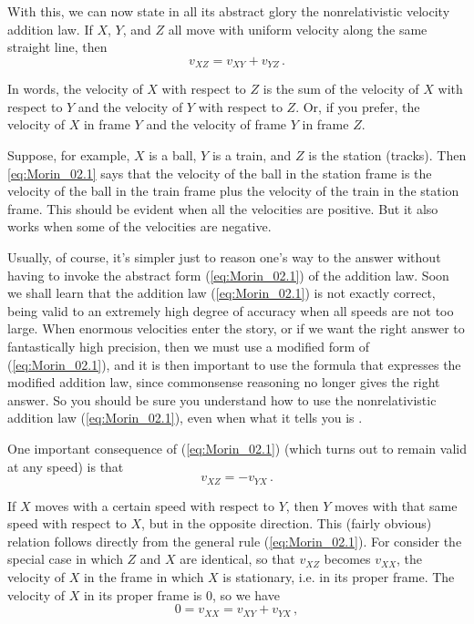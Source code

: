 With this, we can now state in all its abstract glory the nonrelativistic velocity addition law. If $X$, $Y$, and $Z$ all move with uniform velocity along the same straight line, then 
\begin{equation}\label{eq:Morin_02.1}
v_{XZ} = v_{XY} + v_{YZ}\,. 
\end{equation}

In words, the velocity of $X$ with respect to $Z$ is the sum of the velocity of $X$ with respect to $Y$ and the velocity of $Y$ with respect to $Z$. Or, if you prefer, the velocity of $X$ in frame $Y$ and the velocity of frame $Y$ in frame $Z$.

Suppose, for example, $X$ is a ball, $Y$ is a train, and $Z$ is the station (tracks). Then \ref{eq:Morin_02.1} says that the velocity of the ball in the station frame is the velocity of the ball in the train frame plus the velocity of the train in the station frame. This should be evident when all the velocities are positive. But it also works when some of the velocities are negative. 

Usually, of course, it's simpler just to reason one's way to the answer without having to invoke the abstract form (\ref{eq:Morin_02.1}) of the addition law. Soon we shall learn that the addition law (\ref{eq:Morin_02.1}) is not exactly correct, being valid to an extremely high degree of accuracy when all speeds are not too large. When enormous velocities enter the story, or if we want the right answer to fantastically high precision, then we must use a modified form of (\ref{eq:Morin_02.1}), and it is then important to use the formula that expresses the modified addition law, since commonsense reasoning no longer gives the right answer. So you should be sure you understand how to use the nonrelativistic addition law (\ref{eq:Morin_02.1}), even when what it tells you is .

One important consequence of (\ref{eq:Morin_02.1}) (which turns out to remain valid at any speed) is that 
\begin{equation}\label{eq:Morin_02.2}
v_{XZ} = - v_{YX}\,. 
\end{equation}

If $X$ moves with a certain speed with respect to $Y$, then $Y$ moves with that same speed with respect to $X$, but in the opposite direction. This (fairly obvious) relation follows directly from the general rule (\ref{eq:Morin_02.1}). For consider the special case in which $Z$ and $X$ are identical, so that $v_{XZ}$ becomes $v_{XX}$, the velocity of $X$ in the frame in which $X$ is stationary, i.e. in its proper frame. The velocity of $X$ in its proper frame is $0$, so we have
\begin{equation}\label{eq:Morin_02.3}
0 = v_{XX} = v_{XY} + v_{YX}\,, 
\end{equation}

